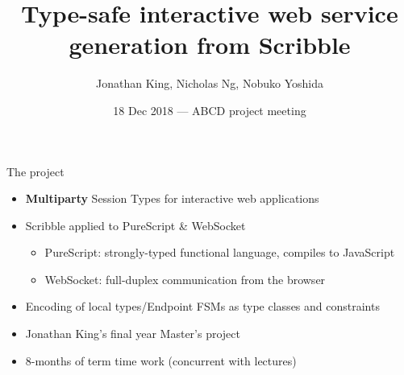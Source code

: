 \documentclass[aspectratio=1610]{beamer}
\title{Type-safe interactive web service generation from Scribble}
\author{Jonathan King, Nicholas Ng, Nobuko Yoshida}
\date{18 Dec 2018 --- ABCD project meeting}
\begin{document}
\maketitle

\begin{frame}{The project}
  \begin{itemize}
    \item \textbf{Multiparty} Session Types for interactive web applications
    \item Scribble applied to PureScript \& WebSocket
      \begin{itemize}
        \item PureScript: strongly-typed functional language, compiles to JavaScript
        \item WebSocket: full-duplex communication from the browser
      \end{itemize}
    \item Encoding of local types/Endpoint FSMs as type classes and constraints
    \item Jonathan King's final year Master's project
    \item 8-months of term time work (concurrent with lectures)
  \end{itemize}
\end{frame}
\end{document}
